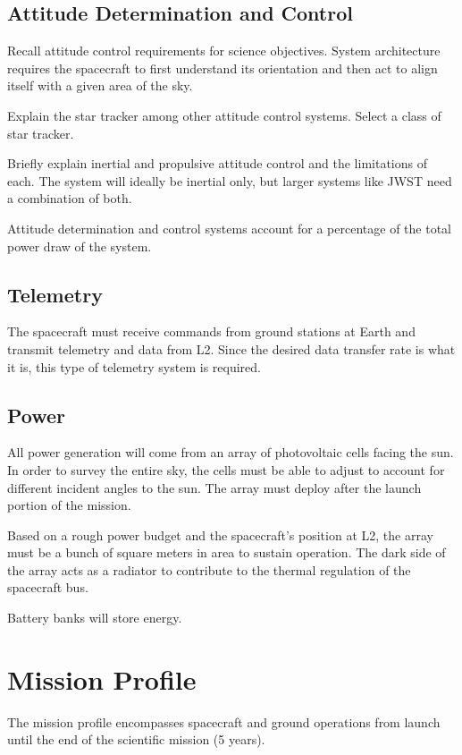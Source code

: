 \documentclass{ws-jai}
\begin{document}
\subsection{Attitude Determination and Control}
\label{sS:adcs}
Recall attitude control requirements for science objectives.
System architecture requires the spacecraft to first understand its orientation and then act to align itself with a given area of the sky.

Explain the star tracker among other attitude control systems.
Select a class of star tracker.

Briefly explain inertial and propulsive attitude control and the limitations of each.
The system will ideally be inertial only, but larger systems like JWST need a combination of both.

Attitude determination and control systems account for a percentage of the total power draw of the system.

\subsection{Telemetry}
\label{sS:telemetry}
The spacecraft must receive commands from ground stations at Earth and transmit telemetry and data from L2.
Since the desired data transfer rate is what it is, this type of telemetry system is required.

\subsection{Power}
\label{sS:power}
All power generation will come from an array of photovoltaic cells facing the sun.
In order to survey the entire sky, the cells must be able to adjust to account for different incident angles to the sun.
The array must deploy after the launch portion of the mission.

Based on a rough power budget and the spacecraft's position at L2, the array must be a bunch of square meters in area to sustain operation.
The dark side of the array acts as a radiator to contribute to the thermal regulation of the spacecraft bus.

Battery banks will store energy.

\section{Mission Profile}
\label{S:mission}
The mission profile encompasses spacecraft and ground operations from launch until the end of the scientific mission (5 years).
\end{document}
